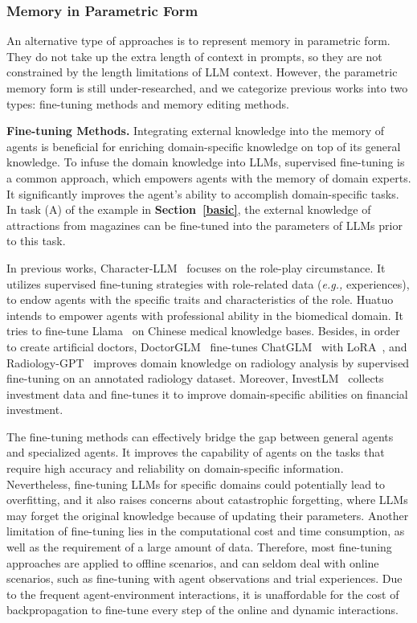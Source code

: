 \documentclass{article}
\theoremstyle{definition}
\theoremstyle{theorem}
\theoremstyle{proof}
\theoremstyle{remark}
\begin{document}
	\subsubsection{Memory in Parametric Form}
	An alternative type of approaches is to represent memory in parametric form. They do not take up the extra length of context in prompts, so they are not constrained by the length limitations of LLM context. However, the parametric memory form is still under-researched, and we categorize previous works into two types: fine-tuning methods and memory editing methods.
	
	\textbf{Fine-tuning Methods.}
	Integrating external knowledge into the memory of agents is beneficial for enriching domain-specific knowledge on top of its general knowledge.
	To infuse the domain knowledge into LLMs, supervised fine-tuning is a common approach, which empowers agents with the memory of domain experts. It significantly improves the agent's ability to accomplish domain-specific tasks.
	In task (A) of the example in \textbf{Section~\ref{basic}}, the external knowledge of attractions from magazines can be fine-tuned into the parameters of LLMs prior to this task.
	
	In previous works, Character-LLM~\cite{character_llm} focuses on the role-play circumstance. It utilizes supervised fine-tuning strategies with role-related data (\textit{e.g.,} experiences), to endow agents with the specific traits and characteristics of the role.
	Huatuo~\cite{huatuo} intends to empower agents with professional ability in the biomedical domain. It tries to fine-tune Llama~\cite{llama} on Chinese medical knowledge bases.
	Besides, in order to create artificial doctors, DoctorGLM~\cite{doctorglm} fine-tunes ChatGLM~\cite{chatglm} with LoRA~\cite{lora}, and Radiology-GPT~\cite{radiology_gpt} improves domain knowledge on radiology analysis by supervised fine-tuning on an annotated radiology dataset. Moreover, InvestLM~\cite{investlm} collects investment data and fine-tunes it to improve domain-specific abilities on financial investment.
	
	The fine-tuning methods can effectively bridge the gap between general agents and specialized agents.
	It improves the capability of agents on the tasks that require high accuracy and reliability on domain-specific information.
	Nevertheless, fine-tuning LLMs for specific domains could potentially lead to overfitting, and it also raises concerns about catastrophic forgetting, where LLMs may forget the original knowledge because of updating their parameters.
	Another limitation of fine-tuning lies in the computational cost and time consumption, as well as the requirement of a large amount of data.
	Therefore, most fine-tuning approaches are applied to offline scenarios, and can seldom deal with online scenarios, such as fine-tuning with agent observations and trial experiences. Due to the frequent agent-environment interactions, it is unaffordable for the cost of backpropagation to fine-tune every step of the online and dynamic interactions.
	
\end{document}
